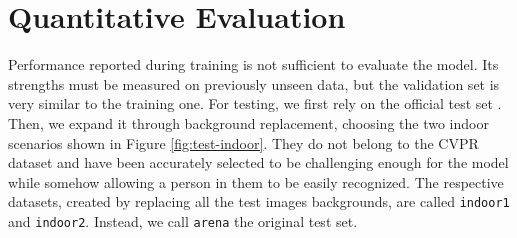 \section{Quantitative Evaluation}
\label{sec:evaluation-quantitative}

Performance reported during training is not sufficient to evaluate the model. Its strengths must be measured on previously unseen data, but the validation set is very similar to the training one. For testing, we first rely on the official test set \cite{mantegazza2019visionbased}. Then, we expand it through background replacement, choosing the two indoor scenarios shown in Figure \ref{fig:test-indoor}. They do not belong to the CVPR dataset and have been accurately selected to be challenging enough for the model while somehow allowing a person in them to be easily recognized. The respective datasets, created by replacing all the test images backgrounds, are called \texttt{indoor1} and \texttt{indoor2}. Instead, we call \texttt{arena} the original test set.

